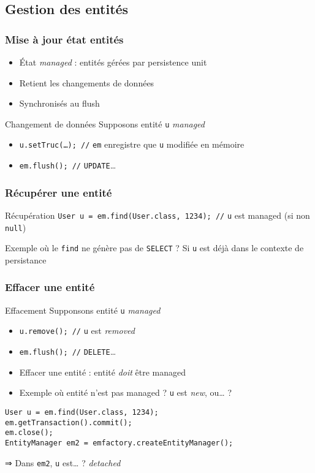\documentclass[english, french]{beamer}
\begin{document}
\subsection{Gestion des entités}
\begin{frame}
	\frametitle{Mise à jour état entités}
	\begin{itemize}
		\item État \emph{managed} : entités gérées par persistence unit
		\item Retient les changements de données
		\item Synchronisés au flush
	\end{itemize}
	\begin{exampleblock}{Changement de données}
		Supposons entité \texttt{u} \emph{managed}
		\begin{itemize}
			\item \texttt{u.setTruc(…); //} \texttt{em} enregistre que \texttt{u} modifiée en mémoire
			\item \texttt{em.flush(); //} \texttt{UPDATE}…
		\end{itemize}
	\end{exampleblock}
\end{frame}

\begin{frame}
	\frametitle{Récupérer une entité}
	\begin{exampleblock}{Récupération}
		\texttt{User u = em.find(User.class, 1234); //} \texttt{u} est managed {\tiny (si non \texttt{null})}
	\end{exampleblock}
	Exemple où le \texttt{find} ne génère pas de \texttt{SELECT} ? \pause Si \texttt{u} est déjà dans le contexte de persistance
\end{frame}

\begin{frame}[fragile]
	\frametitle{Effacer une entité}
	\begin{exampleblock}{Effacement}
		Supponsons entité \texttt{u} \emph{managed}
		\begin{itemize}
			\item \texttt{u.remove(); //} \texttt{u} est \emph{removed}
			\item \texttt{em.flush(); //} \texttt{DELETE}…
		\end{itemize}
	\end{exampleblock}
	\begin{itemize}
		\item Effacer une entité : entité \emph{doit} être \og{}managed\fg{}
		\item Exemple où entité n’est pas \og{}managed\fg{} ? \pause \texttt{u} est \emph{new}, ou… ?
	\end{itemize}
	\begin{lstlisting}
User u = em.find(User.class, 1234);
em.getTransaction().commit();
em.close();
EntityManager em2 = emfactory.createEntityManager();
	\end{lstlisting}
	⇒ Dans \texttt{em2}, \texttt{u} est… ? \pause \emph{detached} 
\end{frame}
\end{document}
